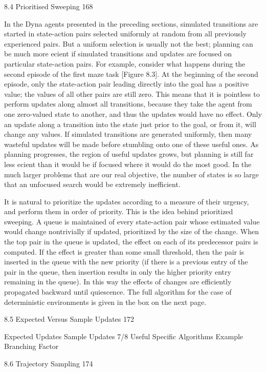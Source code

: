 8.4 Prioritised Sweeping 168

In the Dyna agents presented in the preceding sections, simulated transitions are started in state-action pairs selected uniformly at random from all previously experienced pairs. But a uniform selection is usually not the best; planning can be much more ecient if simulated transitions and updates are focused on particular state-action pairs. For example, consider what happens during the second episode of the first maze task [Figure 8.3]. At the beginning of the second episode, only the state-action pair leading directly into the goal has a positive value; the values of all other pairs are still zero. This means that it is pointless to perform updates along almost all transitions, because they take the agent from one zero-valued state to another, and thus the updates would have no effect. Only an update along a transition into the state just prior to the goal, or from it, will change any values. If simulated transitions are generated uniformly, then many wasteful updates will be made before stumbling onto one of these useful ones. As planning progresses, the region of useful updates grows, but planning is still far less ecient than it would be if focused where it would do the most good. In the much larger problems that are our real objective, the number of states is so large that an unfocused search would be extremely inefficient.

It is natural to prioritize the updates according to a measure of their urgency, and perform them in order of priority. This is the idea behind prioritized sweeping. A queue is maintained of every state-action pair whose estimated value would change nontrivially if updated, prioritized by the size of the change. When the top pair in the queue is updated, the effect on each of its predecessor pairs is computed. If the effect is greater than some small threshold, then the pair is inserted in the queue with the new priority (if there is a previous entry of the pair in the queue, then insertion results in only the higher priority entry remaining in the queue). In this way the effects of changes are efficiently propagated backward until quiescence. The full algorithm for the case of deterministic environments is given in the box on the next page.

8.5 Expected Versus Sample Updates 172

Expected Updates
Sample Updates
7/8 Useful Specific Algorithms Example
Branching Factor

8.6 Trajectory Sampling 174

